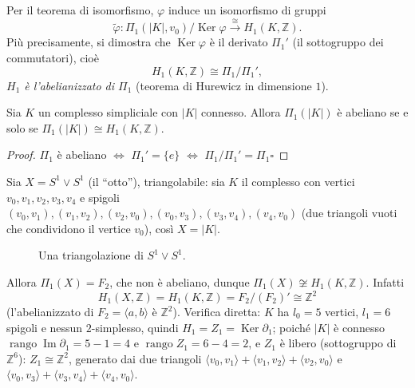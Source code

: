 Per il teorema di isomorfismo, $\varphi$ induce un isomorfismo di gruppi
\[
\widetilde{\varphi}: \Pi_1(|K|, v_0) / \operatorname{Ker} \varphi \xrightarrow{\ \cong\ } H_1(K, \mathbb{Z}) .
\]
Pi\`u precisamente, si dimostra che $\operatorname{Ker} \varphi$ \`e il derivato $\Pi_1'$ (il sottogruppo dei commutatori), cio\`e
\[
\boxed{ H_1(K, \mathbb{Z}) \cong \Pi_1 / \Pi_1' } ,
\]
\emph{$H_1$ \`e l'abelianizzato di $\Pi_1$} (teorema di Hurewicz in dimensione $1$).

\begin{coro}
Sia $K$ un complesso simpliciale con $|K|$ connesso. Allora $\Pi_1(|K|)$ \`e abeliano se e solo se $\Pi_1(|K|) \cong H_1(K, \mathbb{Z})$.
\end{coro}
\begin{proof}
$\Pi_1$ \`e abeliano $\iff$ $\Pi_1' = \{e\}$ $\iff$ $\Pi_1 / \Pi_1' = \Pi_1$\hfill$\square$
\end{proof}

\begin{ejemplo}[$S^1 \vee S^1$]
Sia $X = S^1 \vee S^1$ (il ``otto''), triangolabile: sia $K$ il complesso con vertici $v_0, v_1, v_2, v_3, v_4$ e spigoli $(v_0, v_1), (v_1, v_2), (v_2, v_0), (v_0, v_3), (v_3, v_4), (v_4, v_0)$ (due triangoli vuoti che condividono il vertice $v_0$), cos\`i $X = |K|$.

\begin{figure}[H]
    \centering
    \caption{Una triangolazione di $S^1 \vee S^1$.}
\end{figure}

Allora $\Pi_1(X) = F_2$, che non \`e abeliano, dunque $\Pi_1(X) \not\cong H_1(K, \mathbb{Z})$. Infatti
\[
H_1(X, \mathbb{Z}) = H_1(K, \mathbb{Z}) = F_2 / (F_2)' \cong \mathbb{Z}^2
\]
(l'abelianizzato di $F_2 = \langle a, b \rangle$ \`e $\mathbb{Z}^2$). Verifica diretta: $K$ ha $l_0 = 5$ vertici, $l_1 = 6$ spigoli e nessun $2$-simplesso, quindi $H_1 = Z_1 = \operatorname{Ker}\partial_1$; poich\'e $|K|$ \`e connesso $\operatorname{rango}\operatorname{Im}\partial_1 = 5 - 1 = 4$ e $\operatorname{rango} Z_1 = 6 - 4 = 2$, e $Z_1$ \`e libero (sottogruppo di $\mathbb{Z}^6$): $Z_1 \cong \mathbb{Z}^2$, generato dai due triangoli $\langle v_0, v_1 \rangle + \langle v_1, v_2 \rangle + \langle v_2, v_0 \rangle$ e $\langle v_0, v_3 \rangle + \langle v_3, v_4 \rangle + \langle v_4, v_0 \rangle$.
\end{ejemplo}

